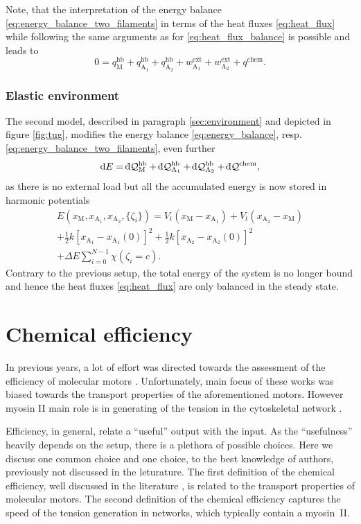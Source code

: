 \documentclass[aps,pre,twocolumn,showpacs,showkeys,superscriptaddress,floatfix]{revtex4-1}
\newcommand{\rmd}{{\mathrm d}}
\newcommand{\dbar}{{\mathchar '26 \mkern-11mu {\mathrm d}}}
\begin{document}
Note, that the interpretation of the energy balance \eqref{eq:energy_balance_two_filaments} in terms of the heat fluxes \eqref{eq:heat_flux}
while following the same arguments as for \eqref{eq:heat_flux_balance} is possible and leads to   
\[
0 = q_\text{M}^\text{hb} + q_{\text{A}_1}^\text{hb} + q_{\text{A}_2}^\text{hb} + w^\text{ext}_{\text{A}_1} + w^\text{ext}_{\text{A}_2} + q^\text{chem} .
\]

\subsubsection{Elastic environment}
The second model, described in paragraph \ref{sec:environment} and depicted in figure \ref{fig:tug}, 
modifies the energy balance \eqref{eq:energy_balance}, resp. \eqref{eq:energy_balance_two_filaments}, even further
\begin{equation*}
\rmd E = \dbar {\mathcal Q}_\text{M}^\text{hb} + \dbar {\mathcal Q}_{\text{A}_1}^\text{hb} + \dbar {\mathcal Q}_{\text{A}_2}^\text{hb} + \dbar {\mathcal Q}^\text{chem}, 
\end{equation*}
as there is no external load but all the accumulated energy is now stored in harmonic potentials 
\begin{multline*}
E( x_\text{M}, x_{\text{A}_1}, x_{\text{A}_2}, \{ \zeta_i \}) 
= V_t( x_\text{M} - x_{\text{A}_1} ) 
+ V_t( x_{\text{A}_2} - x_\text{M} ) 
\\
+ \frac{1}{2} k \left[ x_{\text{A}_1} - x_{\text{A}_1}(0) \right]^2 
+ \frac{1}{2} k \left[ x_{\text{A}_2} - x_{\text{A}_2}(0) \right]^2 
\\
+ \Delta E \sum\limits_{i=0}^{N-1} \chi( \zeta_i = c ) .
\end{multline*}
Contrary to the previous setup, the total energy of the system is no longer bound and hence the heat fluxes \eqref{eq:heat_flux} are only balanced in the steady state. 

\section{Chemical efficiency} 
\label{sec:efficiency}
In previous years, a lot of effort was directed towards the assessment of the efficiency of molecular motors \cite{Schmiedl2008}. %
Unfortunately, main focus of these works was biased towards the transport properties of the aforementioned motors. 
However myosin II main role is in generating of the tension in the cytoskeletal network \cite{}. %

Efficiency, in general, relate a ``useful'' output with the input.
As the ``usefulness'' heavily depends on the setup, there is a plethora of possible choices.
Here we discuss one common choice and one choice, to the best knowledge of authors, previously not discussed in the leturature. 
The first definition of the chemical efficiency, well discussed in the literature \cite{}, is related to the transport properties of molecular motors. 
The second definition of the chemical efficiency captures the speed of the tension generation in networks, which typically contain a myosin~II. 
\end{document}
